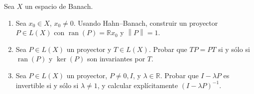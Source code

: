 \documentclass{article}
\theoremstyle{definition}
\newcommand{\R}{\mathbb{R}}
\newcommand{\norm}[1]{\left\lVert #1 \right\rVert}       %
\newcommand{\ran}{\operatorname{ran}}
\newenvironment{ejercicio}[1]{\begin{trivlist}
\item[\hskip \labelsep {\bfseries Ejercicio}\hskip \labelsep {\bfseries #1.}]}{\end{trivlist}}
\begin{document}
\vspace{0.3cm}

\begin{ejercicio}{5}
    Sea \( X \) un espacio de Banach.
    \begin{enumerate}
        \item Sea \( x_0 \in X \), \( x_0 \neq 0 \). Usando Hahn--Banach, construir un proyector \( P \in L(X) \) con \( \ran(P) = \R x_0 \) y \( \norm{P} = 1 \).
        \item Sea \( P \in L(X) \) un proyector y \( T \in L(X) \). Probar que \( TP = PT \) si y sólo si \( \ran(P) \) y \( \ker(P) \) son invariantes por \( T \).
        \item Sea \( P \in L(X) \) un proyector, \( P \neq 0, I \), y \( \lambda \in \R \). Probar que \( I - \lambda P \) es invertible si y sólo si \( \lambda \neq 1 \), y calcular explícitamente \( {(I - \lambda P)}^{-1} \).
    \end{enumerate}
\end{ejercicio}
\end{document}
